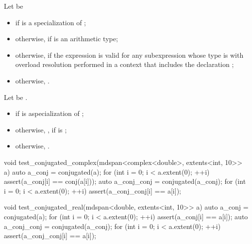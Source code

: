 \begin{itemdescr}
\pnum
Let  be
\begin{itemize}
\item
{}
if  is a specialization of ;
\item
otherwise,
 if  is an arithmetic type;
\item
otherwise,
if the expression  is valid for any subexpression 
whose type is 
with overload resolution performed in a context that includes the declaration
;
\item
otherwise,
.
\end{itemize}

\pnum
\returns
Let  be .
\begin{itemize}
\item
{}
if  is a\newline specialization of ;
\item
otherwise,
, if  is ;
\item
otherwise,
.
\end{itemize}
\end{itemdescr}

\pnum
\begin{example}
\begin{codeblock}
void test_conjugated_complex(mdspan<complex<double>, extents<int, 10>> a) {
  auto a_conj = conjugated(a);
  for (int i = 0; i < a.extent(0); ++i) {
    assert(a_conj[i] == conj(a[i]));
  }
  auto a_conj_conj = conjugated(a_conj);
  for (int i = 0; i < a.extent(0); ++i) {
    assert(a_conj_conj[i] == a[i]);
  }
}

void test_conjugated_real(mdspan<double, extents<int, 10>> a) {
  auto a_conj = conjugated(a);
  for (int i = 0; i < a.extent(0); ++i) {
    assert(a_conj[i] == a[i]);
  }
  auto a_conj_conj = conjugated(a_conj);
  for (int i = 0; i < a.extent(0); ++i) {
    assert(a_conj_conj[i] == a[i]);
  }
}
\end{codeblock}
\end{example}

